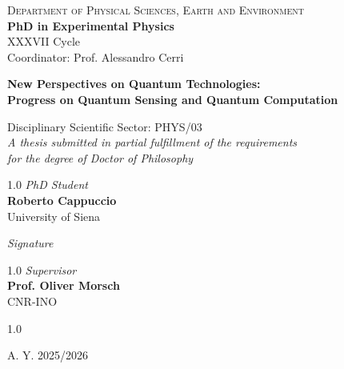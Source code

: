 \begin{titlepage}
\vspace{15mm}
\begin{figure}
\centering
\vspace{3mm}
\end{figure}
\begin{center}
{\large{\textsc{Department of Physical Sciences, Earth and Environment}\\ \vspace{1mm} \textbf{PhD in Experimental Physics}\\ \vspace{1mm} {XXXVII Cycle}\\ \vspace{1mm} {Coordinator: Prof. Alessandro Cerri}}}
\end{center}
\vspace{5mm}
\begin{center}
{\Large{\bf{New Perspectives on Quantum Technologies: \\ Progress on Quantum Sensing and Quantum Computation}}\\}
\end{center}
\vspace{5mm}
\begin{center}
{\large{Disciplinary Scientific Sector: PHYS/03} \\ \vspace{4mm} \textsl{A thesis submitted in partial fulfillment of the requirements}\\ \textsl{for the degree of Doctor of Philosophy}}
\end{center}
\vspace{4mm}
\begin{spacing}{1.0}
\noindent
\large{\textsl{PhD Student}}\\
\large{\textbf{Roberto Cappuccio}}\\
\large{University of Siena}\\
\end{spacing}
\vspace{-7pt}
\begin{center}
\large{\textsl{Signature}}
\end{center}
\begin{spacing}{1.0}
\noindent
\large{\textsl{Supervisor}}\\
\large{\textbf{Prof. Oliver Morsch}}\\
\large{CNR-INO}
\end{spacing}
\begin{spacing}{1.0}
\noindent
\end{spacing}
\vspace{-7pt}
\vspace{14mm}
\begin{center}
\small{A. Y. 2025/2026}
\end{center}
\end{titlepage}
